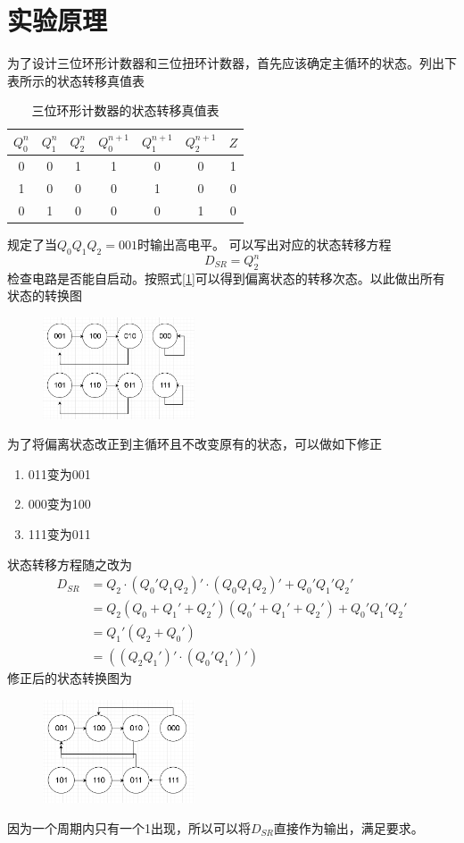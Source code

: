 \documentclass{ctexart}
\begin{document}
\section{实验原理}
为了设计三位环形计数器和三位扭环计数器，首先应该确定主循环的状态。列出下表所示的状态转移真值表
\begin{table}[H]
    \centering
    \caption{三位环形计数器的状态转移真值表}
    \begin{tabular}{ccccccc}
    \hline 
        $Q_0^n$ & $Q_1^n$ & $Q_2^n$ & $Q_0^{n+1}$ & $Q_1^{n+1}$ & $Q_2^{n+1}$ & $Z$\\ \hline 
        0 & 0 & 1 & 1 & 0 & 0 & 1\\
        1 & 0 & 0 & 0 & 1 & 0 & 0\\ \hline
        0 & 1 & 0 & 0 & 0 & 1 & 0\\
    \end{tabular}
    \label{状态转移真值表}
\end{table}
规定了当$Q_0Q_1Q_2=001$时输出高电平。
可以写出对应的状态转移方程
\begin{equation}\label{1}
    D_{SR}=Q_2^{n}
\end{equation}
检查电路是否能自启动。按照式\ref{1}可以得到偏离状态的转移次态。以此做出所有状态的转换图
\begin{figure}[H]
    \centering
    \includegraphics[width=0.4\textwidth]{环形不能自启动.png}
\end{figure}
为了将偏离状态改正到主循环且不改变原有的状态，可以做如下修正
\begin{enumerate}
    \item 011变为001
    \item 000变为100
    \item 111变为011
\end{enumerate}
状态转移方程随之改为
\begin{align}
    D_{SR}&=Q_2\cdot (Q_0'Q_1Q_2)'\cdot (Q_0Q_1Q_2)'+Q_0'Q_1'Q_2'\\
          &=Q_2(Q_0+Q_1'+Q_2')(Q_0'+Q_1'+Q_2')+Q_0'Q_1'Q_2'\\
          &=Q_1'(Q_2+Q_0')\\
          &=((Q_2Q_1')'\cdot (Q_0'Q_1')')
\end{align}
修正后的状态转换图为
\begin{figure}[H]
    \centering
    \includegraphics[width=0.4\textwidth]{环形能自启动.png}
\end{figure}
因为一个周期内只有一个1出现，所以可以将$D_{SR}$直接作为输出，满足要求。
\end{document}

